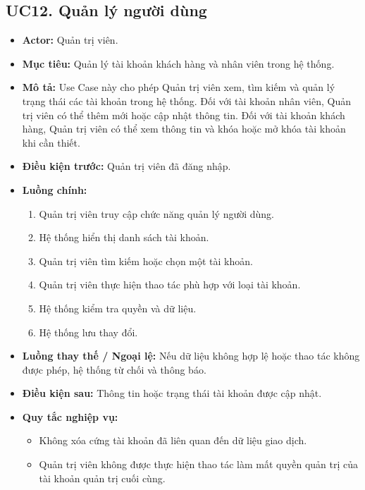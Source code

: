 \documentclass[12pt,a4paper]{article}
\begin{document}
\subsection*{UC12. Quản lý người dùng}

\begin{itemize}

    \item \textbf{Actor:} Quản trị viên.

    \item \textbf{Mục tiêu:} Quản lý tài khoản khách hàng và nhân viên trong hệ thống.

    \item \textbf{Mô tả:} Use Case này cho phép Quản trị viên xem, tìm kiếm và quản lý trạng thái các tài khoản trong hệ thống. Đối với tài khoản nhân viên, Quản trị viên có thể thêm mới hoặc cập nhật thông tin. Đối với tài khoản khách hàng, Quản trị viên có thể xem thông tin và khóa hoặc mở khóa tài khoản khi cần thiết.

    \item \textbf{Điều kiện trước:} Quản trị viên đã đăng nhập.

    \item \textbf{Luồng chính:}
    \begin{enumerate}
        \item Quản trị viên truy cập chức năng quản lý người dùng.
        \item Hệ thống hiển thị danh sách tài khoản.
        \item Quản trị viên tìm kiếm hoặc chọn một tài khoản.
        \item Quản trị viên thực hiện thao tác phù hợp với loại tài khoản.
        \item Hệ thống kiểm tra quyền và dữ liệu.
        \item Hệ thống lưu thay đổi.
    \end{enumerate}

    \item \textbf{Luồng thay thế / Ngoại lệ:} Nếu dữ liệu không hợp lệ hoặc thao tác không được phép, hệ thống từ chối và thông báo.

    \item \textbf{Điều kiện sau:} Thông tin hoặc trạng thái tài khoản được cập nhật.

    \item \textbf{Quy tắc nghiệp vụ:}
    \begin{itemize}
        \item Không xóa cứng tài khoản đã liên quan đến dữ liệu giao dịch.
        \item Quản trị viên không được thực hiện thao tác làm mất quyền quản trị của tài khoản quản trị cuối cùng.
    \end{itemize}

\end{itemize}
\end{document}
